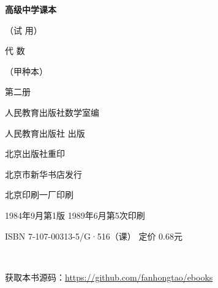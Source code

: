 \begin{titlepage}
    \begin{center}
        \vspace*{3cm}

        {\Large \textbf{高级中学课本} }

        {\Large（试 用）}

        \vspace{1cm}

        {\Huge 代 \qquad 数}

        \vspace{0.5cm}

        {\Large （甲种本）}

        {\Large 第二册}

        \vspace{1cm}
        {\Large 人民教育出版社数学室编}

        \vfill


        人民教育出版社 出版

        北京出版社重印

        北京市新华书店发行

        北京印刷一厂印刷

        1984年9月第1版  \qquad 1989年6月第5次印刷

        ISBN 7-107-00313-5/G·516（课） \quad 定价 0.68元

        \,

        获取本书源码：\url{https://github.com/fanhongtao/ebooks}
    \end{center}
 \end{titlepage}
